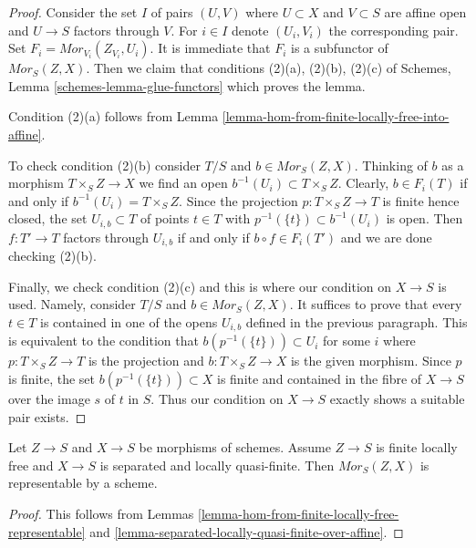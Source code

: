 \begin{proof}
Consider the set $I$ of pairs $(U, V)$ where $U \subset X$ and $V \subset S$
are affine open and $U \to S$ factors through $V$. For $i \in I$ denote
$(U_i, V_i)$ the corresponding pair. Set
$F_i = \mathit{Mor}_{V_i}(Z_{V_i}, U_i)$.
It is immediate that $F_i$ is a subfunctor of $\mathit{Mor}_S(Z, X)$.
Then we claim that conditions
(2)(a), (2)(b), (2)(c) of
Schemes, Lemma \ref{schemes-lemma-glue-functors} which proves the lemma.

\medskip\noindent
Condition (2)(a) follows from
Lemma \ref{lemma-hom-from-finite-locally-free-into-affine}.

\medskip\noindent
To check condition (2)(b) consider $T/S$ and $b \in \mathit{Mor}_S(Z, X)$.
Thinking of $b$ as a morphism $T \times_S Z \to X$ we find an open
$b^{-1}(U_i) \subset T \times_S Z$. Clearly, $b \in F_i(T)$
if and only if $b^{-1}(U_i) = T \times_S Z$. Since the projection
$p : T \times_S Z \to T$ is finite hence closed, the set
$U_{i, b} \subset T$ of points $t \in T$ with
$p^{-1}(\{t\}) \subset b^{-1}(U_i)$ is open.
Then $f : T' \to T$ factors through $U_{i, b}$ if and only
if $b \circ f \in F_i(T')$ and we are done checking (2)(b).

\medskip\noindent
Finally, we check condition (2)(c) and this is where our condition
on $X \to S$ is used. Namely, consider
$T/S$ and $b \in \mathit{Mor}_S(Z, X)$.
It suffices to prove that every $t \in T$
is contained in one of the opens $U_{i, b}$ defined
in the previous paragraph.
This is equivalent to the condition that
$b(p^{-1}(\{t\})) \subset U_i$ for some $i$
where $p : T \times_S Z \to T$ is the projection and
$b : T \times_S Z \to X$ is the given morphism.
Since $p$ is finite, the set $b(p^{-1}(\{t\})) \subset X$
is finite and contained in the fibre of $X \to S$ over
the image $s$ of $t$ in $S$.
Thus our condition on $X \to S$ exactly shows a
suitable pair exists.
\end{proof}

\begin{lemma}
\label{lemma-hom-from-finite-locally-free-separated-lqf}
Let $Z \to S$ and $X \to S$ be morphisms of schemes.
Assume $Z \to S$ is finite locally free and $X \to S$
is separated and locally quasi-finite.
Then $\mathit{Mor}_S(Z, X)$ is representable by a scheme.
\end{lemma}

\begin{proof}
This follows from
Lemmas \ref{lemma-hom-from-finite-locally-free-representable} and
\ref{lemma-separated-locally-quasi-finite-over-affine}.
\end{proof}









